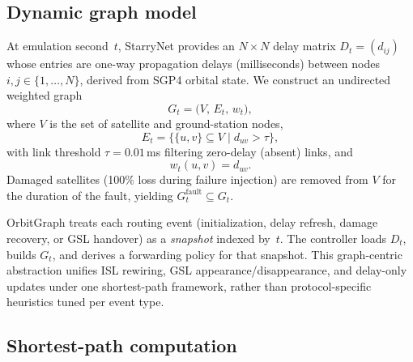 \subsection{Dynamic graph model}


At emulation second~$t$, StarryNet provides an $N \times N$ delay matrix
$D_t = (d_{ij})$ whose entries are one-way propagation delays (milliseconds)
between nodes $i,j \in \{1,\ldots,N\}$, derived from SGP4 orbital state.
We construct an undirected weighted graph
\begin{equation}
  G_t = \bigl(V,\, E_t,\, w_t\bigr),
  \label{eq:graph}
\end{equation}
where $V$ is the set of satellite and ground-station nodes,
\begin{equation}
  E_t = \bigl\{ \{u,v\} \subseteq V \;\big|\;
         d_{uv} > \tau \bigr\},
  \label{eq:edges}
\end{equation}
with link threshold $\tau = 0.01$\,ms filtering zero-delay (absent) links, and
\begin{equation}
  w_t(u,v) = d_{uv}.
  \label{eq:weight}
\end{equation}
Damaged satellites (100\% loss during failure injection) are removed from $V$
for the duration of the fault, yielding $G_t^{\mathrm{fault}} \subseteq G_t$.

OrbitGraph treats each routing event (initialization, delay refresh, damage
recovery, or GSL handover) as a \emph{snapshot} indexed by~$t$.
The controller loads $D_t$, builds $G_t$, and derives a forwarding policy for
that snapshot.
This graph-centric abstraction unifies ISL rewiring, GSL appearance/disappearance,
and delay-only updates under one shortest-path framework, rather than
protocol-specific heuristics tuned per event type.

\subsection{Shortest-path computation}

